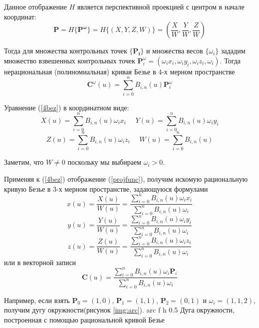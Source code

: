 \documentclass{bmstu}
\begin{document}
Данное отображение $H$ является перспективной проекцией с центром в начале координат:
\begin{equation}\label{projfunc}
    \mathbf{P} = H\{\mathbf{P^\omega}\} = H\{(X, Y, Z, W)\} =
    \left(\frac{X}{W}, \frac{Y}{W}, \frac{Z}{W}\right)
\end{equation}

Тогда для множества контрольных точек $\{\mathbf{P_i}\}$ и множества весов $\{\omega_i\}$ зададим множество взвешенных контрольных точек $\mathbf{P}_i^\omega=(\omega_ix_i,\omega_iy_i,\omega_iz_i, \omega_i)$. Тогда нерациональная (полиномиальная) кривая Безье в 4-х мерном пространстве
\begin{equation}\label{4bez}
    \mathbf{C}^\omega(u) = \sum\limits_{i=0}^nB_{i,n}(u)\mathbf{P}_i^\omega
\end{equation}

Уравнение (\ref{4bez}) в координатном виде:
\begin{equation*}
    X(u) = \sum\limits_{i=0}^nB_{i,n}(u)\omega_ix_i~~~~~~ Y(u) = \sum\limits_{i=0}^nB_{i,n}(u)\omega_iy_i
\end{equation*}
\begin{equation*}
    Z(u) = \sum\limits_{i=0}^nB_{i,n}(u)\omega_iz_i~~~~~~ W(u) = \sum\limits_{i=0}^nB_{i,n}(u)
\end{equation*}

Заметим, что $W \neq 0$ поскольку мы выбираем $\omega_i > 0$.

Применяя к (\ref{4bez}) отображение (\ref{projfunc}), получим искомую рациональную кривую Безье в 3-х мерном пространстве, задающуюся формулами
\[
    x(u) = \frac{X(u)}{W(u)}= \frac{\sum\limits_{i=0}^nB_{i,n}(u)\omega_ix_i}{\sum\limits_{i=0}^nB_{i,n}(u)\omega_i}
\]
\[
    y(u) = \frac{Y(u)}{W(u)}= \frac{\sum\limits_{i=0}^nB_{i,n}(u)\omega_iy_i}{\sum\limits_{i=0}^nB_{i,n}(u)\omega_i}
\]
\[
    z(u) = \frac{Z(u)}{W(u)}= \frac{\sum\limits_{i=0}^nB_{i,n}(u)\omega_iz_i}{\sum\limits_{i=0}^nB_{i,n}(u)\omega_i}
\]
или в векторной записи
\begin{equation}\label{ratcurve}
    \mathbf{C}(u) = \frac{\sum\limits_{i=0}^nB_{i,n}(u)\omega_i\mathbf{P}_i}{\sum\limits_{i=0}^nB_{i,n}(u)\omega_i}
\end{equation}



Например, если взять $\mathbf{P}_0 = (1,0)$, $\mathbf{P}_1 = (1,1)$, $\mathbf{P}_2 = (0,1)$ и $\omega_i = (1, 1, 2)$, получим дугу окружности(рисунок \ref{img:arc}).
{arc} %
{f} %
{h} %
{0.5\textwidth} %
{Дуга окружности, построенная с помощью рациональной кривой Безье} %
\end{document}
